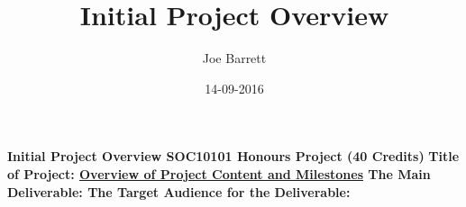 \documentclass{article}
\title{Initial Project Overview}
\date{14-09-2016}
\author{Joe Barrett}
\begin{document}
	{\LARGE
		{\bf
			Initial Project Overview
			\newline
			SOC10101 Honours Project (40 Credits)
			\newline
		}
	}
	{\Large
		{\bf
			Title of Project:
			\newline
			\underline{Overview of Project Content and Milestones}
			\newline
			The Main Deliverable:
			\newline
			The Target Audience for the Deliverable:
		}
	}
\end{document}
